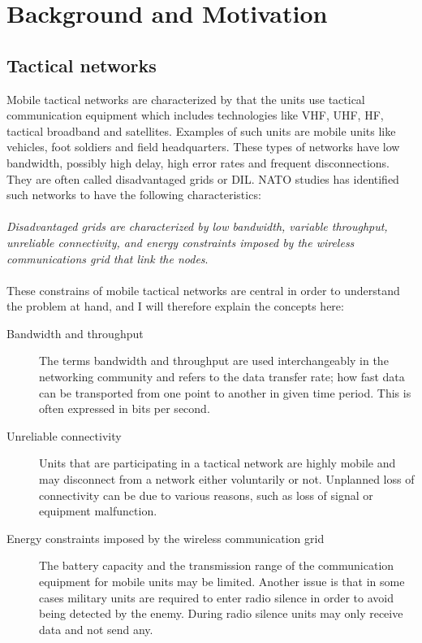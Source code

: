 \documentclass[USenglish]{article}
\begin{document}
\section{Background and Motivation}

\subsection{Tactical networks}
Mobile tactical networks are characterized by that the units use tactical
communication equipment which includes technologies like VHF, UHF, HF, tactical
broadband and satellites. Examples of such units are mobile units like vehicles,
foot soldiers and field headquarters. These types of networks have low
bandwidth, possibly high delay, high error rates and frequent disconnections.
They are often called disadvantaged grids or DIL. NATO studies has
identified such networks to have the following characteristics:

\paragraph{}
\textit{Disadvantaged grids are characterized by low bandwidth, variable
throughput, unreliable connectivity, and energy constraints imposed by the
wireless communications grid that link the
nodes}\cite{nato-disadvantaged-grids}.

\paragraph{}
These constrains of mobile tactical networks are central in order to understand the problem at hand, and I will therefore explain the concepts here:

\begin{description}
\item[Bandwidth and throughput] The terms bandwidth and throughput are used interchangeably in the networking community and refers to the data transfer rate; how fast data can be transported from one point to another in given time period. This is often expressed in bits per second.
\item[Unreliable connectivity] Units that are participating in a tactical network are highly mobile and may disconnect from a network either voluntarily or not. Unplanned loss of connectivity can be due to various reasons, such as loss of signal or equipment malfunction.
\item[Energy constraints imposed by the wireless communication grid] The battery capacity and the transmission range of the communication equipment for mobile units may be limited. Another issue is that in some cases military units are required to enter radio silence in order to avoid being detected by the enemy. During radio silence units may only receive data and not send any.
\end{description}
\end{document}
